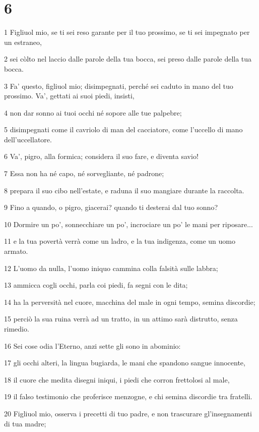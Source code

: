 \chapter{6}

\par 1 Figliuol mio, se ti sei reso garante per il tuo prossimo, se ti sei impegnato per un estraneo,
\par 2 sei còlto nel laccio dalle parole della tua bocca, sei preso dalle parole della tua bocca.
\par 3 Fa' questo, figliuol mio; disimpegnati, perché sei caduto in mano del tuo prossimo. Va', gettati ai suoi piedi, insisti,
\par 4 non dar sonno ai tuoi occhi né sopore alle tue palpebre;
\par 5 disimpegnati come il cavriolo di man del cacciatore, come l'uccello di mano dell'uccellatore.
\par 6 Va', pigro, alla formica; considera il suo fare, e diventa savio!
\par 7 Essa non ha né capo, né sorvegliante, né padrone;
\par 8 prepara il suo cibo nell'estate, e raduna il suo mangiare durante la raccolta.
\par 9 Fino a quando, o pigro, giacerai? quando ti desterai dal tuo sonno?
\par 10 Dormire un po', sonnecchiare un po', incrociare un po' le mani per riposare...
\par 11 e la tua povertà verrà come un ladro, e la tua indigenza, come un uomo armato.
\par 12 L'uomo da nulla, l'uomo iniquo cammina colla falsità sulle labbra;
\par 13 ammicca cogli occhi, parla coi piedi, fa segni con le dita;
\par 14 ha la perversità nel cuore, macchina del male in ogni tempo, semina discordie;
\par 15 perciò la sua ruina verrà ad un tratto, in un attimo sarà distrutto, senza rimedio.
\par 16 Sei cose odia l'Eterno, anzi sette gli sono in abominio:
\par 17 gli occhi alteri, la lingua bugiarda, le mani che spandono sangue innocente,
\par 18 il cuore che medita disegni iniqui, i piedi che corron frettolosi al male,
\par 19 il falso testimonio che proferisce menzogne, e chi semina discordie tra fratelli.
\par 20 Figliuol mio, osserva i precetti di tuo padre, e non trascurare gl'insegnamenti di tua madre;
